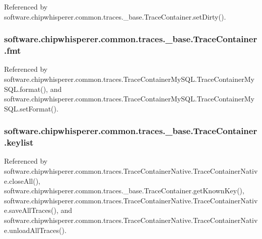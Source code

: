 Referenced by software.\+chipwhisperer.\+common.\+traces.\+\_\+base.\+Trace\+Container.\+set\+Dirty().

\hypertarget{classsoftware_1_1chipwhisperer_1_1common_1_1traces_1_1__base_1_1TraceContainer_a6e1bd3471c3ac501e40159bfd63c3607}{}
\subsubsection[{fmt}]{\setlength{\rightskip}{0pt plus 5cm}software.\+chipwhisperer.\+common.\+traces.\+\_\+base.\+Trace\+Container.\+fmt}\label{classsoftware_1_1chipwhisperer_1_1common_1_1traces_1_1__base_1_1TraceContainer_a6e1bd3471c3ac501e40159bfd63c3607}


Referenced by software.\+chipwhisperer.\+common.\+traces.\+Trace\+Container\+My\+S\+Q\+L.\+Trace\+Container\+My\+S\+Q\+L.\+format(), and software.\+chipwhisperer.\+common.\+traces.\+Trace\+Container\+My\+S\+Q\+L.\+Trace\+Container\+My\+S\+Q\+L.\+set\+Format().

\hypertarget{classsoftware_1_1chipwhisperer_1_1common_1_1traces_1_1__base_1_1TraceContainer_af0dba15ea361e9e3dfe9fb93a9af81f9}{}
\subsubsection[{keylist}]{\setlength{\rightskip}{0pt plus 5cm}software.\+chipwhisperer.\+common.\+traces.\+\_\+base.\+Trace\+Container.\+keylist}\label{classsoftware_1_1chipwhisperer_1_1common_1_1traces_1_1__base_1_1TraceContainer_af0dba15ea361e9e3dfe9fb93a9af81f9}


Referenced by software.\+chipwhisperer.\+common.\+traces.\+Trace\+Container\+Native.\+Trace\+Container\+Native.\+close\+All(), software.\+chipwhisperer.\+common.\+traces.\+\_\+base.\+Trace\+Container.\+get\+Known\+Key(), software.\+chipwhisperer.\+common.\+traces.\+Trace\+Container\+Native.\+Trace\+Container\+Native.\+save\+All\+Traces(), and software.\+chipwhisperer.\+common.\+traces.\+Trace\+Container\+Native.\+Trace\+Container\+Native.\+unload\+All\+Traces().

